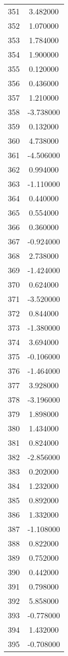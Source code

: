 \documentclass[12pt]{article}
\begin{document}
\begin{longtable}{@{}cc@{}}
351 & 3.482000 \\
352 & 1.070000 \\
353 & 1.784000 \\
354 & 1.900000 \\
355 & 0.120000 \\
356 & 0.436000 \\
357 & 1.210000 \\
358 & -3.738000 \\
359 & 0.132000 \\
360 & 4.738000 \\
361 & -4.506000 \\
362 & 0.994000 \\
363 & -1.110000 \\
364 & 0.440000 \\
365 & 0.554000 \\
366 & 0.360000 \\
367 & -0.924000 \\
368 & 2.738000 \\
369 & -1.424000 \\
370 & 0.624000 \\
371 & -3.520000 \\
372 & 0.844000 \\
373 & -1.380000 \\
374 & 3.694000 \\
375 & -0.106000 \\
376 & -1.464000 \\
377 & 3.928000 \\
378 & -3.196000 \\
379 & 1.898000 \\
380 & 1.434000 \\
381 & 0.824000 \\
382 & -2.856000 \\
383 & 0.202000 \\
384 & 1.232000 \\
385 & 0.892000 \\
386 & 1.332000 \\
387 & -1.108000 \\
388 & 0.822000 \\
389 & 0.752000 \\
390 & 0.442000 \\
391 & 0.798000 \\
392 & 5.858000 \\
393 & -0.778000 \\
394 & 1.432000 \\
395 & -0.708000 \\

\end{longtable}
\end{document}

